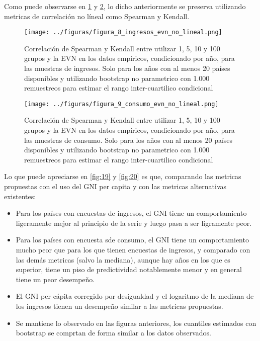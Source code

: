 Como puede observarse en \ref{fig:8} y \ref{fig:9}, lo dicho anteriormente se preserva utilizando metricas de correlación no líneal como Spearman y Kendall.

\begin{figure}[H] %
    \centering %
    \texttt{[image: ../figuras/figura\_8\_ingresos\_evn\_no\_lineal.png]} %
    \caption{Correlación de Spearman y Kendall entre utilizar 1, 5, 10 y 100 grupos y la EVN en los datos empiricos, condicionado por año, para las muestras de ingresos. Solo para los años con al menos 20 países disponibles y utilizando bootstrap no parametrico con 1.000 remuestreos para estimar el rango inter-cuartilico condicional}
    \label{fig:8} %
\end{figure}



\begin{figure}[H] %
    \centering %
    \texttt{[image: ../figuras/figura\_9\_consumo\_evn\_no\_lineal.png]} %
    \caption{Correlación de Spearman y Kendall entre utilizar 1, 5, 10 y 100 grupos y la EVN en los datos empiricos, condicionado por año, para las muestras de consumo. Solo para los años con al menos 20 países disponibles y utilizando bootstrap no parametrico con 1.000 remuestreos para estimar el rango inter-cuartilico condicional}
    \label{fig:9} %
\end{figure}

Lo que puede apreciarse en \ref{fig:19} y \ref{fig:20} es que, comparando las metricas propuestas con el uso del GNI per capita y con las metricas alternativas existentes:


\begin{itemize}
    \item  Para los países con encuestas de ingresos, el GNI tiene un comportamiento ligeramente mejor al principio de la serie y luego pasa a ser ligramente peor.
    \item Para los países con encuesta sde consumo, el GNI tiene un comportamiento mucho peor que para los que tienen encuestas de ingresos, y comparado con las demás metricas (salvo la mediana), aunque hay años en los que es superior, tiene un piso de predictividad notablemente menor y en general tiene un peor desempeño.
    \item El GNI per cápita corregido por desigualdad y el logaritmo de la mediana de los ingresos tienen un desempeño similar a las metricas propuestas.
    \item Se mantiene lo observado en las figuras anteriores, los cuantiles estimados con bootstrap se comprtan de forma similar a los datos observados.
\end{itemize}



